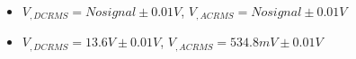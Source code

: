 \begin{itemize}
     \item $V_{, DCRMS}=No signal\pm 0.01\unit{V}$, $V_{, ACRMS}=No signal\pm 0.01\unit{V}$ 
     \item $V_{, DCRMS}=13.6V\pm 0.01\unit{V}$, $V_{, ACRMS}=534.8mV\pm 0.01\unit{V}$\\
\end{itemize}